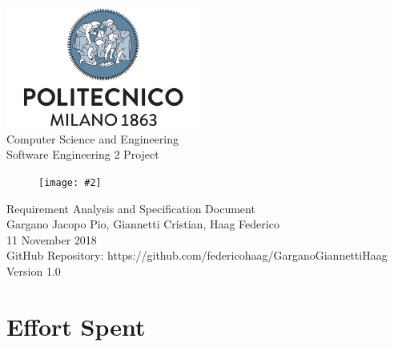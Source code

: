 \documentclass{report}
\newcommand{\image}[4]{
	\begin{figure}[H]
	\centering
	\texttt{[image: \#2]}
	\caption*{#3}
	\label{#4}

	\label{fig:nonfloat} %
	\end{figure}
}
\begin{document}
	\begin{titlepage}
		\centering	
		\vfill
		{
			\includegraphics[width =\linewidth, height = 4cm, keepaspectratio]{PolitecnicoLogo.png}
			\label{fig:PolitecnicoLogo}
			\large \\[2ex]Computer Science and Engineering\\
			\large Software Engineering 2 Project\\[9ex]			
			\image{5cm}{TrackMeLogo.png}{}{TrackMeLogo}
			\huge Requirement Analysis and Specification Document\\[4ex]

			\normalsize Gargano Jacopo Pio, Giannetti Cristian, Haag Federico\\[1.5ex]
			\normalsize 11 November 2018 \\[1.5ex]
			\normalsize GitHub Repository: https://github.com/federicohaag/GarganoGiannettiHaag\\[3ex]
			\normalsize Version 1.0


		}
		
	\end{titlepage}

	
	\newpage
	\tableofcontents
	\thispagestyle{fancy}
	
	\newpage
	
	
	
	
	
		
	\chapter{Effort Spent}
	\thispagestyle{fancy}
\end{document}
